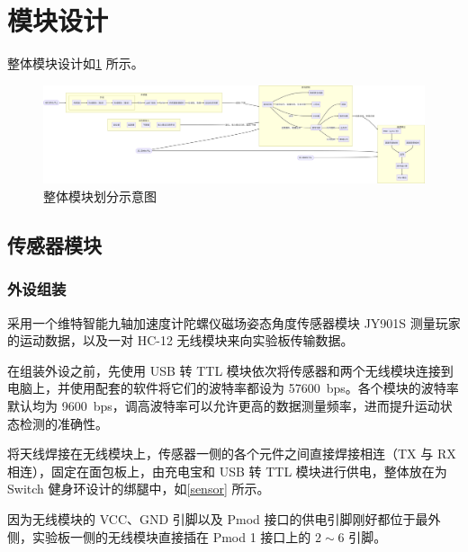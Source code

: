 \documentclass[UTF8, 11pt, fontset=none]{ctexart}
\begin{document}
\section{模块设计}

整体模块设计如\cref{modules} 所示。

\begin{figure}[H]
    \centering
    \includegraphics[width=\textwidth]{images/modules.png}
    \caption{整体模块划分示意图}
    \label{modules}
\end{figure}

\subsection{传感器模块}

\subsubsection{外设组装}

采用一个维特智能九轴加速度计陀螺仪磁场姿态角度传感器模块 JY901S 测量玩家的运动数据，以及一对 HC-12 无线模块来向实验板传输数据。

在组装外设之前，先使用 USB 转 TTL 模块依次将传感器和两个无线模块连接到电脑上，并使用配套的软件将它们的波特率都设为 \SI{57600}{bps}。各个模块的波特率默认均为 \SI{9600}{bps}，调高波特率可以允许更高的数据测量频率，进而提升运动状态检测的准确性。

将天线焊接在无线模块上，传感器一侧的各个元件之间直接焊接相连（TX 与 RX 相连），固定在面包板上，由充电宝和 USB 转 TTL 模块进行供电，整体放在为 Switch 健身环设计的绑腿中，如\cref{sensor} 所示。

因为无线模块的 VCC、GND 引脚以及 Pmod 接口的供电引脚刚好都位于最外侧，实验板一侧的无线模块直接插在 Pmod 1 接口上的 $2 \sim 6$ 引脚。
\end{document}

